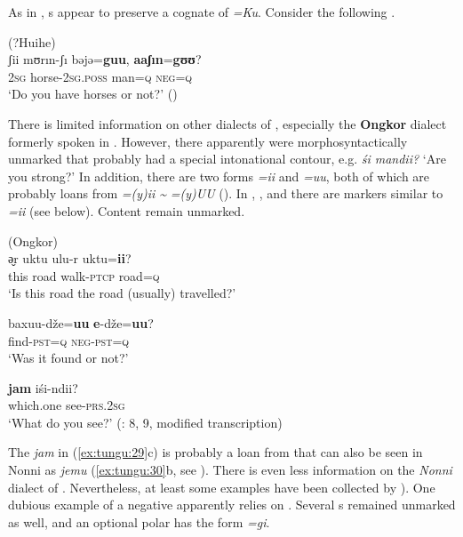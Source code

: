 \clearpage    
As in , s appear to preserve a cognate of  \textit{=Ku}. Consider the following .

\ea%
    \label{ex:tungu:28}
     (?Huihe)\\
    \gll ʃii  mʊrın-ʃı    bəjə=\textbf{{guu}}, \textbf{{aaʃın}}{=}\textbf{{gʊʊ}}?\\
    2\textsc{sg}  horse-2\textsc{sg.poss}  man=\textsc{q}    \textsc{neg}=\textsc{q}\\
    \glt ‘Do you have horses or not?’ (\citealt{HuZengyiChaoke1986})
    \z

There is limited information on other dialects of , especially the \textbf{Ongkor} dialect formerly spoken in . However, there apparently were morphosyntactically unmarked  that probably had a special intonational contour, e.g. \textit{śi mandii?} ‘Are you strong?’ \citep[11]{Aalto1979} In addition, there are two forms \textit{=ii} and \textit{=uu}, both of which are probably loans from  \textit{=(y)}\textit{ii {\textasciitilde}} \textit{=(y)}\textit{UU} (). In , , and  there are markers similar to \textit{=ii} (see below). Content  remain unmarked.

\ea%
    \label{ex:tungu:29}
    \ea
     (Ongkor)\\  
    \gll ə̬r  uktu  ulu-r    uktu=\textbf{{ii}}?\\
    this  road  walk-\textsc{ptcp}  road=\textsc{q}\\
    \glt ‘Is this road the road (usually) travelled?’
    
    \ex
    \gll baxuu-dže=\textbf{{uu}} \textbf{{e}}{-dže=}\textbf{{uu}}?\\
    find-\textsc{pst}=\textsc{q}    \textsc{neg}-\textsc{pst}=\textsc{q}\\
    \glt ‘Was it found or not?’
    
    \ex
    \gll \textbf{{jam}} iśi-ndii?\\
    which.one  see-\textsc{prs}.2\textsc{sg}\\
    \glt ‘What do you see?’ (\citealt{Aalto1979}: 8, 9, modified transcription)
    \z\z

\noindent The  \textit{jam} in (\ref{ex:tungu:29}c) is probably a loan from  that can also be seen in Nonni  as \textit{jemu} (\ref{ex:tungu:30}b, see ). There is even less information on the \textit{Nonni} dialect of . Nevertheless, at least some examples have been collected by \cite{Ivanovskij1982}). One dubious example of a negative  apparently relies on . Several s remained unmarked as well, and an optional polar  has the form \textit{=gi}.

